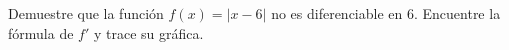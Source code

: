 \item Demuestre que la función $f(x) = |x - 6|$ no es diferenciable en 6. Encuentre la fórmula de $f'$ y trace su gráfica.
